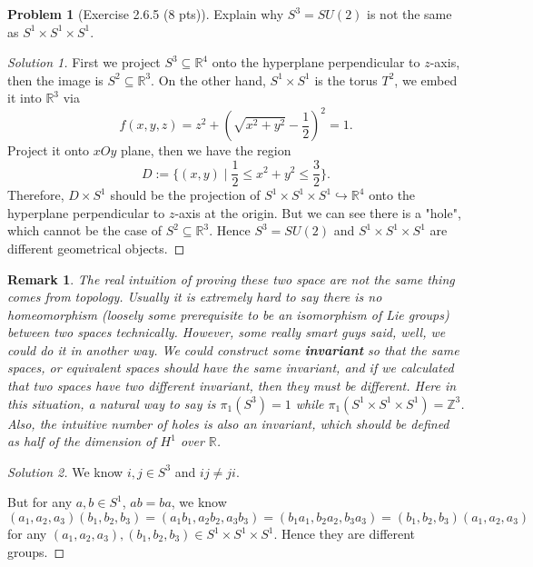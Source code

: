 \documentclass{article}
\theoremstyle{definition}
\newtheorem{problem}{Problem}
\theoremstyle{plain}
\newtheorem*{remark}{Remark}
\begin{document}
\begin{problem}[Exercise 2.6.5 (8 pts)]Explain why $S^3=SU(2)$ is not the same as $S^1\times S^1\times S^1$.
\end{problem}
\begin{adjustwidth}{0.7cm}{}
\color{blue}
\begin{proof}[Solution 1]First we project $S^3\subseteq\mathbb{R}^4$ onto the hyperplane perpendicular to $z$-axis, then the image is $S^2\subseteq\mathbb{R}^3$. On the other hand, $S^1\times S^1$ is the torus $T^2$, we embed it into $\mathbb{R}^3$ via
\begin{displaymath}
f(x,y,z)=z^2+(\sqrt{x^2+y^2}-\frac{1}{2})^2=1.
\end{displaymath}
Project it onto $xOy$ plane, then we have the region
\begin{displaymath}
D:=\{(x,y)\mid\frac{1}{2}\leq x^2+y^2\leq\frac{3}{2}\}.
\end{displaymath}
Therefore, $D\times S^1$ should be the projection of $S^1\times S^1\times S^1\hookrightarrow\mathbb{R}^4$ onto the hyperplane perpendicular to $z$-axis at the origin. But we can see there is a "hole", which cannot be the case of $S^2\subseteq\mathbb{R}^3$. Hence $S^3=SU(2)$ and $S^1\times S^1\times S^1$ are different geometrical objects.
\color{black}
\end{proof}
\end{adjustwidth}
\begin{remark}
The real intuition of proving these two space are not the same thing comes from topology. Usually it is extremely hard to say there is no homeomorphism (loosely some prerequisite to be an isomorphism of Lie groups) between two spaces technically. However, some really smart guys said, well, we could do it in another way. We could construct some \textbf{invariant} so that the same spaces, or equivalent spaces should have the same invariant, and if we calculated that two spaces have two different invariant, then they must be different. Here in this situation, a natural way to say is $\pi_1(S^3)=1$ while $\pi_1(S^1\times S^1\times S^1)=\mathbb{Z}^3$. Also, the intuitive number of holes is also an invariant, which should be defined as half of the dimension of $H^1$ over $\mathbb{R}$.
\end{remark}
\begin{adjustwidth}{0.7cm}{}
\color{blue}
\begin{proof}[Solution 2]We know $i,j\in S^3$ and $ij\neq ji$.\par
But for any $a,b\in S^1$, $ab=ba$, we know
\begin{displaymath}
(a_1,a_2,a_3)(b_1,b_2,b_3)=(a_1b_1,a_2b_2,a_3b_3)=(b_1a_1,b_2a_2,b_3a_3)=(b_1,b_2,b_3)(a_1,a_2,a_3)
\end{displaymath}
for any $(a_1,a_2,a_3),(b_1,b_2,b_3)\in S^1\times S^1\times S^1$. Hence they are different groups.
\color{black}
\end{proof}
\end{adjustwidth}
\end{document}
